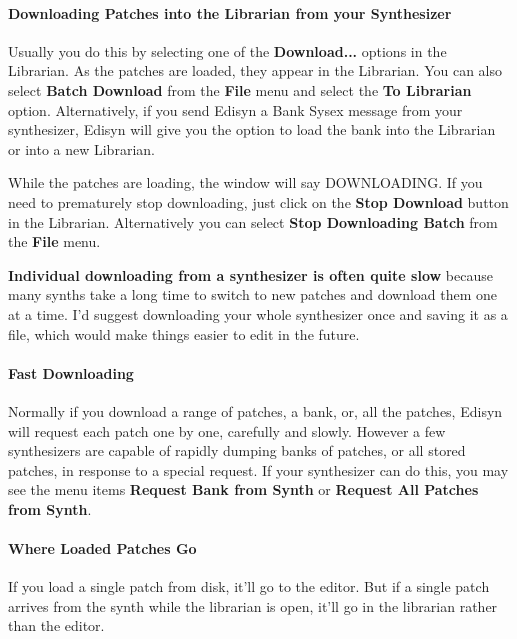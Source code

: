 \documentclass{article}
\begin{document}
\paragraph{Downloading Patches into the Librarian from your Synthesizer}

Usually you do this by selecting one of the {\bf Download...} options in the Librarian.  As the patches are loaded, they appear in the Librarian.  You can also select {\bf Batch Download} from the {\bf File} menu and select the {\bf To Librarian} option.  Alternatively, if you send Edisyn a Bank Sysex message from your synthesizer, Edisyn will give you the option to load the bank into the Librarian or into a new Librarian. 

While the patches are loading, the window will say {DOWNLOADING}.  If you need to prematurely stop downloading, just click on the {\bf Stop Download} button in the Librarian.  Alternatively you can select {\bf Stop Downloading Batch} from the {\bf File} menu.

{\color{red}\bf Individual downloading from a synthesizer is often quite slow} because many synths take a long time to switch to new patches and download them one at a time.  I'd suggest downloading your whole synthesizer once and saving it as a file, which would make things easier to edit in the future.

\paragraph{Fast Downloading}

Normally if you download a range of patches, a bank, or, all the patches, Edisyn will request each patch one by one, carefully and slowly.  However a few synthesizers are capable of rapidly dumping banks of patches, or all stored patches, in response to a special request.  If your synthesizer can do this, you may see the menu items {\bf Request Bank from Synth} or {\bf Request All Patches from Synth}.


\paragraph{Where Loaded Patches Go}

If you load a single patch from disk, it'll go to the editor.  But if a single patch arrives from the synth while the librarian is open, it'll go in the librarian rather than the editor.  %
\end{document}
